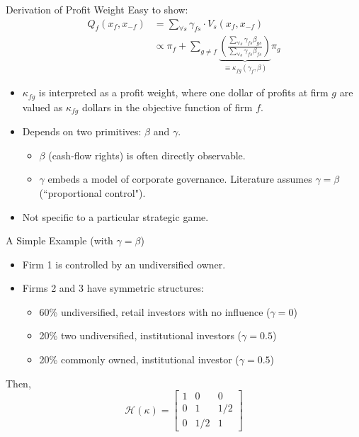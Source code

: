\documentclass[handout, serif, aspectratio=169, 10pt]{beamer}
\begin{document}
\begin{frame}{Derivation of Profit Weight}
\small
Easy to show:
\begin{align*}
Q_{f}\left(x_{f}, x_{-f}\right) &=\sum_{\forall s} \gamma_{f s} \cdot V_{s}\left(x_{f}, x_{-f}\right)\\
&\propto \pi_{f}+\sum_{g \neq f} \underbrace{\left(\frac{\sum_{\forall s} \gamma_{f s} \beta_{g s}}{\sum_{\forall s} \gamma_{f s} \beta_{f s}}\right)}_{\equiv \kappa_{f g}\left(\gamma_{f}, \beta\right)} \pi_{g}
\end{align*}
\begin{itemize}
    \item $\kappa_{fg}$ is interpreted as a \alert{profit weight}, where one dollar of profits at firm $g$ are valued as $\kappa_{fg}$ dollars in the objective function of firm $f$.
    \item Depends on two primitives: $\beta$ and $\gamma$.
\begin{itemize}
    \item $\beta$ (cash-flow rights) is often directly observable.
    \item $\gamma$ embeds a model of corporate governance. Literature assumes $\gamma = \beta$ (``proportional control").
\end{itemize}
\item Not specific to a particular strategic game.
\end{itemize}
\end{frame}

\begin{frame}[plain,label=simpleexample]{A Simple Example (with $\gamma = \beta$)}
\begin{itemize}
\item Firm 1 is controlled by an undiversified owner.
\item Firms 2 and 3 have symmetric structures:
\begin{itemize}
\item 60\% undiversified, retail investors with no influence ($\gamma = 0$)
\item 20\% two undiversified, institutional investors  ($\gamma = 0.5$)
\item 20\% commonly owned, institutional investor  ($\gamma = 0.5$)
\end{itemize}
\end{itemize}
Then,
$$
 \mathcal{H}(\kappa)= \begin{bmatrix}1 & 0 & 0 \\ 0 & 1 & 1/2 \\ 0 & 1/2 & 1\end{bmatrix}  
$$

\end{frame}
\end{document}
